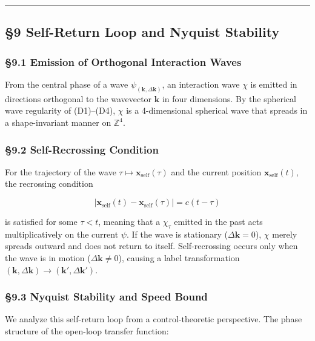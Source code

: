 \documentclass[
  a4paper,11pt]{article}
\theoremstyle{definition}
\theoremstyle{remark}
\begin{document}
\begin{center}\rule{0.5\linewidth}{0.5pt}\end{center}

\subsection{§9 Self-Return Loop and Nyquist
Stability}\label{self-return-loop-and-nyquist-stability}

\subsubsection{§9.1 Emission of Orthogonal Interaction
Waves}\label{emission-of-orthogonal-interaction-waves}

From the central phase of a wave
\(\psi_{(\mathbf{k}, \Delta\mathbf{k})}\), an interaction wave \(\chi\)
is emitted in directions orthogonal to the wavevector \(\mathbf{k}\) in
four dimensions. By the spherical wave regularity of (D1)--(D4),
\(\chi\) is a 4-dimensional spherical wave that spreads in a
shape-invariant manner on \(\mathbb{Z}^4\).

\subsubsection{§9.2 Self-Recrossing
Condition}\label{self-recrossing-condition}

For the trajectory of the wave
\(\tau \mapsto \mathbf{x}_{\mathrm{self}}(\tau)\) and the current
position \(\mathbf{x}_{\mathrm{self}}(t)\), the recrossing condition

\[|\mathbf{x}_{\mathrm{self}}(t) - \mathbf{x}_{\mathrm{self}}(\tau)| = c(t - \tau)\]

is satisfied for some \(\tau < t\), meaning that a \(\chi_\tau\) emitted
in the past acts multiplicatively on the current \(\psi\). If the wave
is stationary (\(\Delta\mathbf{k} = 0\)), \(\chi\) merely spreads
outward and does not return to itself. Self-recrossing occurs only when
the wave is in motion (\(\Delta\mathbf{k} \neq 0\)), causing a label
transformation
\((\mathbf{k}, \Delta\mathbf{k}) \to (\mathbf{k}', \Delta\mathbf{k}')\).

\subsubsection{§9.3 Nyquist Stability and Speed
Bound}\label{nyquist-stability-and-speed-bound}

We analyze this self-return loop from a control-theoretic perspective.
The phase structure of the open-loop transfer function:
\end{document}

